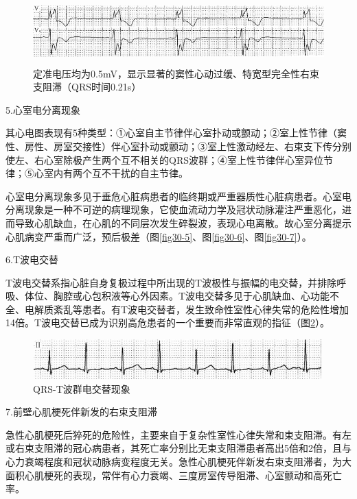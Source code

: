 \begin{figure}[!htbp]
 \centering
 \includegraphics[width=5.58333in,height=0.98958in]{./images/Image00546.jpg}
 \captionsetup{justification=centering}
 \caption{定准电压均为0.5mV，显示显著的窦性心动过缓、特宽型完全性右束支阻滞（QRS时间0.21s）}
 \label{fig34-6}
  \end{figure} 

5.心室电分离现象

其心电图表现有5种类型：①心室自主节律伴心室扑动或颤动；②室上性节律（窦性、房性、房室交接性）伴心室扑动或颤动；③室上性激动经左、右束支下传分别使左、右心室除极产生两个互不相关的QRS波群；④室上性节律伴心室异位节律；⑤心室内有两个互不干扰的自主节律。

心室电分离现象多见于垂危心脏病患者的临终期或严重器质性心脏病患者。心室电分离现象是一种不可逆的病理现象，它使血流动力学及冠状动脉灌注严重恶化，进而导致心肌缺血，在心肌的不同层次发生碎裂波，表现心电离散。故心室分离提示心肌病变严重而广泛，预后极差（图\ref{fig30-5}、图\ref{fig30-6}、图\ref{fig30-7}）。

6.T波电交替

T波电交替系指心脏自身复极过程中所出现的T波极性与振幅的电交替，并排除呼吸、体位、胸腔或心包积液等心外因素。T波电交替多见于心肌缺血、心功能不全、电解质紊乱等患者。有T波电交替者，发生致命性室性心律失常的危险性增加14倍。T波电交替已成为识别高危患者的一个重要而非常直观的指征（图\ref{fig34-7}）。

\begin{figure}[!htbp]
 \centering
 \includegraphics[width=4.38542in,height=0.60417in]{./images/Image00547.jpg}
 \captionsetup{justification=centering}
 \caption{QRS-T波群电交替现象}
 \label{fig34-7}
  \end{figure} 

7.前壁心肌梗死伴新发的右束支阻滞

急性心肌梗死后猝死的危险性，主要来自于复杂性室性心律失常和束支阻滞。有左或右束支阻滞的冠心病患者，其死亡率分别比无束支阻滞患者高出5倍和2倍，且与心力衰竭程度和冠状动脉病变程度无关。急性心肌梗死伴新发右束支阻滞者，为大面积心肌梗死的表现，常伴有心力衰竭、三度房室传导阻滞、心室颤动和高死亡率。

